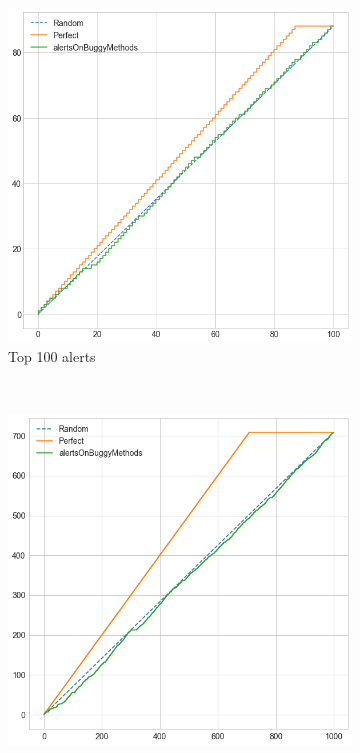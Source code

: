\begin{figure}[H]
	\begin{subfigure}{\textwidth}
		\centering
		\includegraphics[scale=0.3]{./src/methodBug/methodbug_cumulative_graph_top100.png}
		\caption{Top 100 alerts}\label{}
	\end{subfigure}\\
	\begin{subfigure}{.5\textwidth}
		\centering
		\includegraphics[scale=0.3]{./src/methodBug/methodbug_cumulative_graph_top1000.png}

\end{subfigure}
\end{figure}
